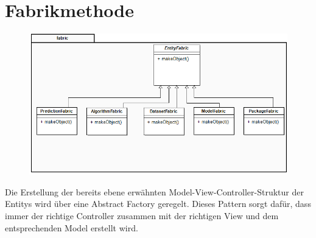 \section{Fabrikmethode}

\begin{figure}[h]
\centering
\includegraphics[width=0.6\linewidth]{Grafik/Klassendiagramme/fabrik.png}
\end{figure}


Die Erstellung der bereits ebene erwähnten Model-View-Controller-Struktur der Entitys wird über eine Abstract Factory geregelt. Dieses Pattern sorgt dafür, dass immer der richtige Controller zusammen mit der richtigen View und dem entsprechenden Model erstellt wird.


